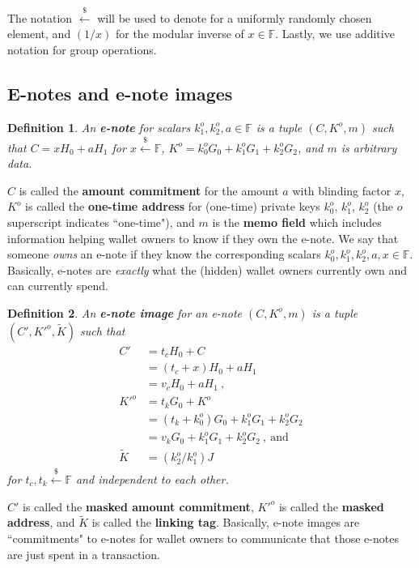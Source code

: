 \documentclass{article}
\theoremstyle{plain}
\newtheorem{definition}{Definition}[section]
\theoremstyle{remark}
\begin{document}
The notation $\xleftarrow{\$}$ will be used to denote for a uniformly randomly chosen element, and $(1/x)$ for the modular inverse of $x\in\mathbb{F}$. Lastly, we use additive notation for group operations.

\subsection{E-notes and e-note images}
\begin{definition}\label{e-note}
An \textbf{\em e-note} for scalars $k_1^o, k_2^o, a \in\mathbb{F}$ is a tuple $(C, K^o, m)$ such that $C = x H_0 + a H_1$ for $x\xleftarrow{\$}\mathbb{F}$, $K^o = k_0^o G_0 + k_1^o G_1 + k_2^o G_2$, and $m$ is arbitrary data.
\end{definition}
$C$ is called the \textbf{amount commitment} for the amount $a$ with blinding factor $x$, $K^o$ is called the \textbf{one-time address} for (one-time) private keys $k_0^o$, $k_1^o$, $k_2^o$ (the $o$ superscript indicates ``one-time"), and $m$ is the \textbf{memo field} which includes information helping wallet owners to know if they own the e-note. We say that someone \textit{owns} an e-note if they know the corresponding scalars $k_0^o, k_1^o, k_2^o, a, x \in\mathbb{F}$. Basically, e-notes are \textit{exactly} what the (hidden) wallet owners currently own and can currently spend.

\begin{definition}\label{e-note-img}
An \textbf{\em e-note image} for an e-note $(C, K^o, m)$ is a tuple $(C', K'^o, \tilde{K})$ such that
\begin{align*}
C' &= t_c H_0 + C \\ &= (t_c+x) H_0 + a H_1 \\ &= v_c H_0 + a H_1 \ , \\
K'^o &= t_k G_0 + K^o \\ &= (t_k + k_0^o) G_0 + k_1^o G_1 + k_2^o G_2 \\ &= v_k G_0 + k_1^o G_1 + k_2^o G_2 \ ,\ \text{and} \\
\tilde{K} &= (k_2^o/k_1^o)J
\end{align*}
for $t_c, t_k \xleftarrow{\$}\mathbb{F}$ and independent to each other.
\end{definition}
$C'$ is called the \textbf{masked amount commitment}, $K'^o$ is called the \textbf{masked address}, and $\tilde{K}$ is called the \textbf{linking tag}. Basically, e-note images are ``commitments" to e-notes for wallet owners to communicate that those e-notes are just spent in a transaction.
\end{document}
